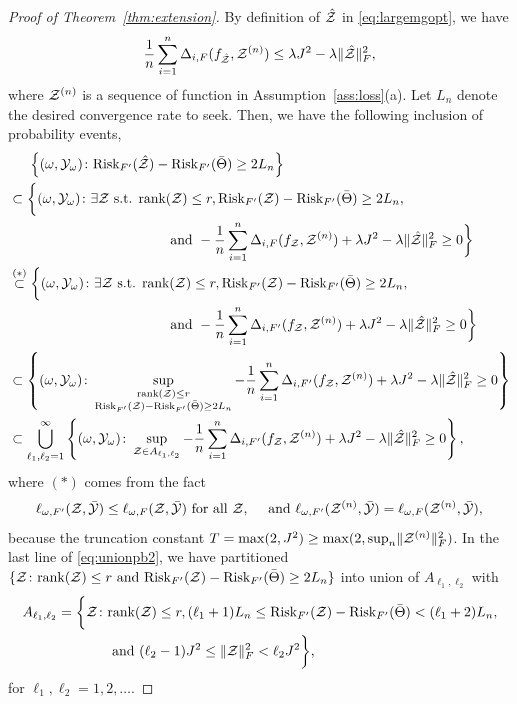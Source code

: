\documentclass[twoside,11pt]{article}
\theoremstyle{definition}
\def\risk{\textup{Risk}}
\begin{document}
\begin{proof}[Proof of Theorem~\ref{thm:extension}]
By definition of $\hat {\mathcal{Z}}$ in \eqref{eq:largemgopt}, we have 
\[ \frac{1}{n}\sum_{i=1}^n \Delta_{i,F}(f_{\hat {\mathcal{Z}}},\mathcal{Z}^{(n)})\leq \lambda J^2-\lambda\lVert\hat{\mathcal{Z}}\rVert_F^2,\] where $\mathcal{Z}^{(n)}$ is a sequence of function in Assumption~\ref{ass:loss}(a).
Let $L_n$ denote the desired convergence rate to seek.  Then, we have the following inclusion of probability events,
\begin{align}\label{eq:unionpb2}
&\hspace{.5cm}\left\{(\omega,\tY_{\omega})\colon \risk_{F'}(\hat \tZ)-\risk_{F'}(\bar\Theta)\geq 2L_n \right\}\nonumber\\
&\subset\bigg\{(\omega,\tY_{\omega})\colon\exists \tZ \text{ s.t. } \text{rank}(\tZ)\leq r,  \risk_{F'}(\tZ)-\risk_{F'}(\bar\Theta)\geq2 L_n,\nonumber
\\& \hspace{4cm}\text{ and } -\frac{1}{n}\sum_{i=1}^n\Delta_{i,F}(f_\tZ,\tZ^{(n)})+\lambda J^2-\lambda\FnormSize{}{\hat\tZ}^2\geq 0 \bigg\}\nonumber\\
&\stackrel{(*)}{\subset}\bigg\{(\omega,\tY_{\omega})\colon\exists \tZ \text{ s.t. } \text{rank}(\tZ)\leq r,  \risk_{F'}(\tZ)-\risk_{F'}(\bar\Theta)\geq2 L_n,\nonumber
\\& \hspace{4cm}\text{ and } -\frac{1}{n}\sum_{i=1}^n\Delta_{i,F'}(f_\tZ,\tZ^{(n)})+\lambda J^2-\lambda\FnormSize{}{\hat\tZ}^2\geq 0 \bigg\}\nonumber\\
&\subset \left\{(\omega,\tY_{\omega})\colon\sup_{\substack{\text{rank}(\tZ)\leq r\\  
\risk_{F'}(\tZ)-\risk_{F'}(\bar\Theta)\geq 2L_n  }}-\frac{1}{n}\sum_{i=1}^n\Delta_{i,F'}(f_\tZ,\tZ^{(n)})+\lambda J^2-\lambda\FnormSize{}{\hat\tZ}^2\geq 0\right\}\nonumber\\
&\subset \bigcup_{\ell_1,\ell_2=1}^{\infty}\left\{(\omega,\tY_\omega)\colon \sup_{\tZ\in A_{\ell_1,\ell_2}}-\frac{1}{n}\sum_{i=1}^n\Delta_{i,F'}(f_\tZ,\tZ^{(n)})+\lambda J^2-\lambda\FnormSize{}{\hat\tZ}^2\geq 0\right\},
\end{align}
where  $(*)$ comes from the fact
 \begin{align}
 \ell_{\omega,F'}(\mathcal{Z},\bar{\mathcal{Y}})\leq \ell_{\omega,F}(\mathcal{Z},\bar{\mathcal{Y}}) \text{ for all } \mathcal{Z},\quad  \text{ and }   \ell_{\omega,F'}(\mathcal{Z}^{(n)},\bar{\mathcal{Y}})= \ell_{\omega,F}(\mathcal{Z}^{(n)},\bar{\mathcal{Y}}), 
 \end{align}
 because the truncation constant $T = \max(2,J^2)\geq \max(2,\sup_n\lVert\mathcal{Z}^{(n)}\rVert_F^2)$.
In the last line of \eqref{eq:unionpb2}, we have partitioned $\{\tZ\colon \text{rank}(\tZ)\leq r \text{ and } \risk_{F'}(\tZ)-\risk_{F'}(\bar\Theta)\geq 2L_n\}$ into union of $A_{\ell_1,\ell_2}$ with 
\begin{align}
A_{\ell_1,\ell_2} = \bigg\{\tZ\colon &\text{rank}(\tZ)\leq r, (\ell_1+1) L_n\leq  \risk_{F'}(\tZ)-\risk_{F'}(\bar\Theta)<(\ell_1+2)L_n,\\
&\text{ and } (\ell_2-1)J^2\leq \FnormSize{}{\tZ}^2<\ell_2 J^2\bigg\},
\end{align}
for $\ell_1,\ell_2 = 1,2,\ldots$. 



\end{proof}
\end{document}
